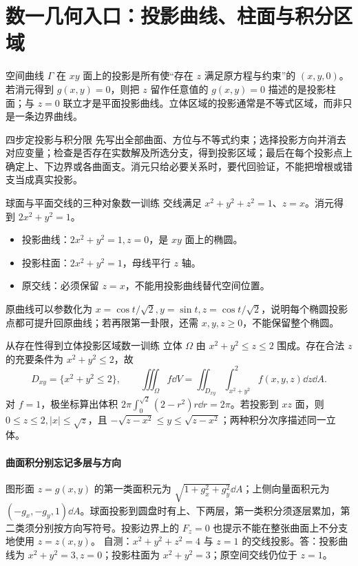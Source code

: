 \section{数一几何入口：投影曲线、柱面与积分区域}\label{r2:projection}
空间曲线 $\Gamma$ 在 $xy$ 面上的投影是所有使“存在 $z$ 满足原方程与约束”的 $(x,y,0)$。若消元得到 $g(x,y)=0$，则把 $z$ 留作任意值的 $g(x,y)=0$ 描述的是投影柱面；与 $z=0$ 联立才是平面投影曲线。立体区域的投影通常是不等式区域，而非只是一条边界曲线。

\begin{method}{四步定投影与积分限}
先写出全部曲面、方位与不等式约束；选择投影方向并消去对应变量；检查是否存在实数解及所选分支，得到投影区域；最后在每个投影点上确定上、下边界或各曲面支。消元只给必要关系时，要代回验证，不能把增根或错支当成真实投影。
\end{method}

\begin{example}{球面与平面交线的三种对象}{数一训练}
交线满足 $x^2+y^2+z^2=1$、$z=x$。消元得到 $2x^2+y^2=1$。
\begin{itemize}
\item 投影曲线：$2x^2+y^2=1,z=0$，是 $xy$ 面上的椭圆。
\item 投影柱面：$2x^2+y^2=1$，母线平行 $z$ 轴。
\item 原交线：必须保留 $z=x$，不能用投影曲线替代空间位置。
\end{itemize}
原曲线可以参数化为 $x=\cos t/\sqrt2,y=\sin t,z=\cos t/\sqrt2$，说明每个椭圆投影点都可提升回原曲线；若再限第一卦限，还需 $x,y,z\ge0$，不能保留整个椭圆。
\end{example}

\begin{example}{从存在性得到立体投影区域}{数一训练}
立体 $\Omega$ 由 $x^2+y^2\le z\le2$ 围成。存在合法 $z$ 的充要条件为 $x^2+y^2\le2$，故
\[
 D_{xy}=\{x^2+y^2\le2\},\qquad
 \iiint_\Omega f\dd V=\iint_{D_{xy}}\int_{x^2+y^2}^2 f(x,y,z)\dd z\dd A.
\]
对 $f=1$，极坐标算出体积 $2\pi\int_0^{\sqrt2}(2-r^2)r\dd r=2\pi$。若投影到 $xz$ 面，则 $0\le z\le2,|x|\le\sqrt z$，且 $-\sqrt{z-x^2}\le y\le\sqrt{z-x^2}$；两种积分次序描述同一立体。
\end{example}

\paragraph{曲面积分别忘记多层与方向}
图形面 $z=g(x,y)$ 的第一类面积元为 $\sqrt{1+g_x^2+g_y^2}\dd A$；上侧向量面积元为 $(-g_x,-g_y,1)\dd A$。球面投影到圆盘时有上、下两层，第一类积分须逐层累加，第二类须分别按方向写符号。投影边界上的 $F_z=0$ 也提示不能在整张曲面上不分支地使用 $z=z(x,y)$。
自测：$x^2+y^2+z^2=4$ 与 $z=1$ 的交线投影。答：投影曲线为 $x^2+y^2=3,z=0$；投影柱面为 $x^2+y^2=3$；原空间交线仍位于 $z=1$。
